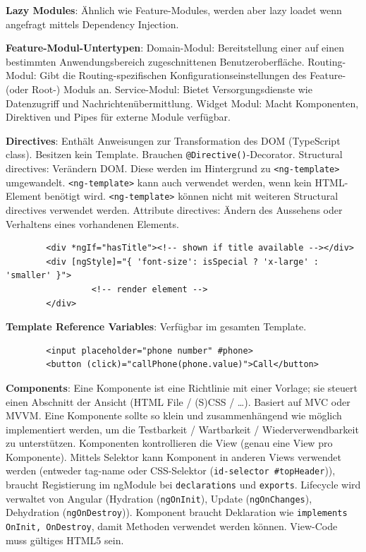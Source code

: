 \documentclass[10pt,landscape]{article}
\begin{document}
\begin{multicols}{2}
        \textbf{Lazy Modules}: Ähnlich wie Feature-Modules, werden aber lazy loadet wenn angefragt mittels Dependency Injection.

        \textbf{Feature-Modul-Untertypen}: Domain-Modul: Bereitstellung einer auf einen bestimmten Anwendungsbereich zugeschnittenen Benutzeroberfläche.
        Routing-Modul: Gibt die Routing-spezifischen Konfigurationseinstellungen des Feature- (oder Root-) Moduls an.
        Service-Modul: Bietet Versorgungsdienste wie Datenzugriff und Nachrichtenübermittlung.
        Widget Modul: Macht Komponenten, Direktiven und Pipes für externe Module verfügbar.

        \textbf{Directives}: Enthält Anweisungen zur Transformation des DOM (TypeScript class).
        Besitzen kein Template.
        Brauchen \lstinline{@Directive()}-Decorator.
        Structural directives: Verändern DOM.
        Diese werden im Hintergrund zu \lstinline{<ng-template>} umgewandelt.
        \lstinline{<ng-template>} kann auch verwendet werden, wenn kein HTML-Element benötigt wird.
        \lstinline{<ng-template>} können nicht mit weiteren Structural directives verwendet werden.
        Attribute directives: Ändern des Aussehens oder Verhaltens eines vorhandenen Elements.

        \begin{lstlisting}
        <div *ngIf="hasTitle"><!-- shown if title available --></div>
        <div [ngStyle]="{ 'font-size': isSpecial ? 'x-large' : 'smaller' }">
                 <!-- render element -->
        </div>
        \end{lstlisting}

        \textbf{Template Reference Variables}: Verfügbar im gesamten Template.

        \begin{lstlisting}
        <input placeholder="phone number" #phone>
        <button (click)="callPhone(phone.value)">Call</button>
        \end{lstlisting}

        \textbf{Components}: Eine Komponente ist eine Richtlinie mit einer Vorlage; sie steuert einen Abschnitt der Ansicht (HTML File / (S)CSS / \ldots).
        Basiert auf MVC oder MVVM.
        Eine Komponente sollte so klein und zusammenhängend wie möglich implementiert werden, um die Testbarkeit / Wartbarkeit / Wiederverwendbarkeit zu unterstützen.
        Komponenten kontrollieren die View (genau eine View pro Komponente).
        Mittels Selektor kann Komponent in anderen Views verwendet werden (entweder tag-name oder CSS-Selektor (\lstinline[mathescape]!id-selector #topHeader!)), braucht Registierung im ngModule bei \lstinline{declarations} und \lstinline{exports}.
        Lifecycle wird verwaltet von Angular (Hydration (\lstinline{ngOnInit}), Update (\lstinline{ngOnChanges}), Dehydration (\lstinline{ngOnDestroy})).
        Komponent braucht Deklaration wie \lstinline{implements OnInit, OnDestroy}, damit Methoden verwendet werden können.
        View-Code muss gültiges HTML5 sein.


\end{multicols}
\end{document}
